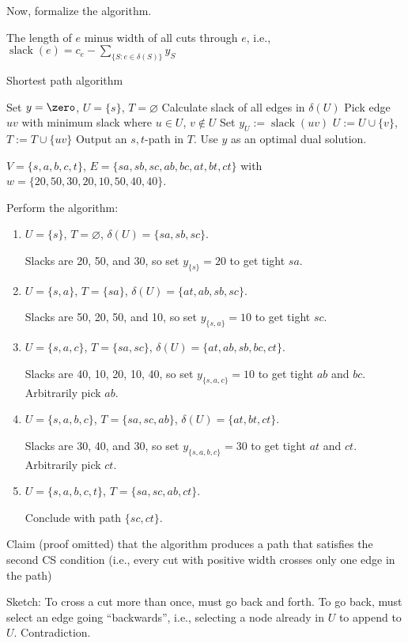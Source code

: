 Now, formalize the algorithm.

\begin{defn}[slack]
  The length of $e$ minus width of all cuts through $e$, i.e.,
  $\operatorname{slack}(e) = c_e - \sum_{\{S : e \in \delta(S)\}}y_S$
\end{defn}

\begin{algorithm}
  \caption{Shortest path algorithm}
  \begin{algorithmic}[1]
    \State Set $y = \zero$, $U = \{s\}$, $T = \varnothing$
    \State Calculate slack of all edges in $\delta(U)$
    \State Pick edge $uv$ with minimum slack where $u \in U$, $v \not\in U$
    \State Set $y_U := \operatorname{slack}(uv)$
    \State $U := U \cup \{v\}$, $T := T \cup \{uv\}$
    \EndWhile
    \State Output an $s,t$-path in $T$. Use $y$ as an optimal dual solution.
  \end{algorithmic}
\end{algorithm}

\begin{example}
  $V = \{s,a,b,c,t\}$,
  $E = \{sa,sb,sc,ab,bc,at,bt,ct\}$ with
  $w = \{20,50,30,20,10,50,40,40\}$.
\end{example}
\begin{sol}
  Perform the algorithm:
  \begin{enumerate}
    \item $U = \{s\}$, $T = \varnothing$, $\delta(U) = \{sa,sb,sc\}$.

          Slacks are 20, 50, and 30, so set $y_{\{s\}} = 20$ to get tight $sa$.

    \item $U = \{s,a\}$, $T = \{sa\}$, $\delta(U) = \{at,ab,sb,sc\}$.

          Slacks are 50, 20, 50, and 10, so set $y_{\{s,a\}} = 10$ to get tight $sc$.
    \item $U = \{s,a,c\}$, $T = \{sa, sc\}$, $\delta(U) = \{at,ab,sb,bc,ct\}$.

          Slacks are 40, 10, 20, 10, 40, so set $y_{\{s,a,c\}}=10$ to get
          tight $ab$ and $bc$. Arbitrarily pick $ab$.
    \item $U = \{s,a,b,c\}$, $T = \{sa,sc,ab\}$, $\delta(U) = \{at,bt,ct\}$.

          Slacks are 30, 40, and 30, so set $y_{\{s,a,b,c\}}=30$ to get
          tight $at$ and $ct$. Arbitrarily pick $ct$.
    \item $U = \{s,a,b,c,t\}$, $T = \{sa,sc,ab,ct\}$.

          Conclude with path $\{sc,ct\}$.
  \end{enumerate}
\end{sol}

Claim (proof omitted) that the algorithm produces a path that
satisfies the second CS condition (i.e., every cut with positive width
crosses only one edge in the path)

Sketch: To cross a cut more than once, must go back and forth. To go
back, must select an edge going ``backwards'', i.e., selecting a
node already in $U$ to append to $U$. Contradiction.

